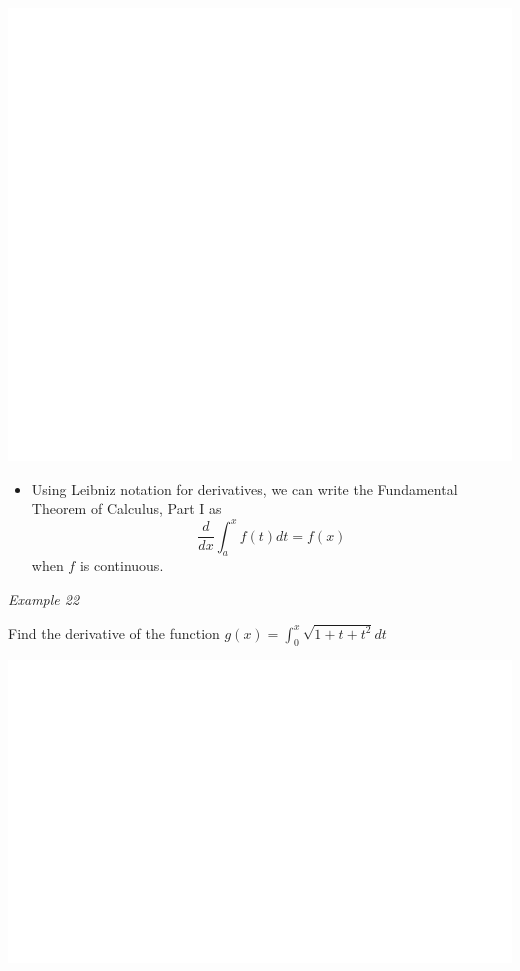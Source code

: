 \documentclass[]{book}
\providecommand{\tightlist}{%
  \setlength{\itemsep}{0pt}\setlength{\parskip}{0pt}}
\begin{document}
\begin{center}\includegraphics[width=1\linewidth]{figure/LB38-1} \end{center}

\newpage

\begin{itemize}
\tightlist
\item
  Using Leibniz notation for derivatives, we can write the Fundamental Theorem of Calculus, Part I as
  \[\frac{d}{dx} \int_a^x f(t) dt= f(x)\]
  when \(f\) is continuous.
\end{itemize}

\emph{Example 22}

Find the derivative of the function \(g(x) = \int_0^x \sqrt{1+ t+ t^2} dt\)

\begin{center}\includegraphics[width=1\linewidth]{figure/LB38b-1} \end{center}
\end{document}
